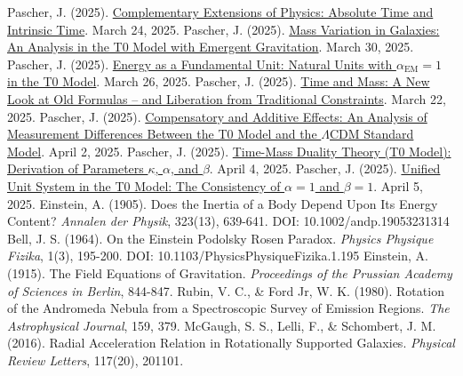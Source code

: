 \documentclass[12pt,a4paper]{article}
\newcommand{\alphaEM}{\alpha_{\text{EM}}}
\begin{document}
	\begin{thebibliography}{99}
		 Pascher, J. (2025). \href{https://github.com/jpascher/T0-Time-Mass-Duality/tree/main/2/pdf/English/KomplementPhysikZeitEn.pdf}{Complementary Extensions of Physics: Absolute Time and Intrinsic Time}. March 24, 2025.
		 Pascher, J. (2025). \href{https://github.com/jpascher/T0-Time-Mass-Duality/tree/main/2/pdf/English/MassVarGalaxienEn.pdf}{Mass Variation in Galaxies: An Analysis in the T0 Model with Emergent Gravitation}. March 30, 2025.
		 Pascher, J. (2025). \href{https://github.com/jpascher/T0-Time-Mass-Duality/tree/main/2/pdf/English/NatEinheitenAlpha1En.pdf}{Energy as a Fundamental Unit: Natural Units with \(\alphaEM = 1\) in the T0 Model}. March 26, 2025.
		 Pascher, J. (2025). \href{https://github.com/jpascher/T0-Time-Mass-Duality/tree/main/2/pdf/English/ZeitMasseNeuerBlickEn.pdf}{Time and Mass: A New Look at Old Formulas – and Liberation from Traditional Constraints}. March 22, 2025.
		 Pascher, J. (2025). \href{https://github.com/jpascher/T0-Time-Mass-Duality/tree/main/2/pdf/English/MessdifferenzenT0StandardEn.pdf}{Compensatory and Additive Effects: An Analysis of Measurement Differences Between the T0 Model and the \(\Lambda\)CDM Standard Model}. April 2, 2025.
		 Pascher, J. (2025). \href{https://github.com/jpascher/T0-Time-Mass-Duality/tree/main/2/pdf/English/ZeitMasseT0ParamsEn.pdf}{Time-Mass Duality Theory (T0 Model): Derivation of Parameters \(\kappa\), \(\alpha\), and \(\beta\)}. April 4, 2025.
		 Pascher, J. (2025). \href{https://github.com/jpascher/T0-Time-Mass-Duality/tree/main/2/pdf/English/Alpha1Beta1KonsistenzEn.pdf}{Unified Unit System in the T0 Model: The Consistency of \(\alpha = 1\) and \(\beta = 1\)}. April 5, 2025.
		 Einstein, A. (1905). Does the Inertia of a Body Depend Upon Its Energy Content? \textit{Annalen der Physik}, 323(13), 639-641. DOI: 10.1002/andp.19053231314
		 Bell, J. S. (1964). On the Einstein Podolsky Rosen Paradox. \textit{Physics Physique Fizika}, 1(3), 195-200. DOI: 10.1103/PhysicsPhysiqueFizika.1.195
		 Einstein, A. (1915). The Field Equations of Gravitation. \textit{Proceedings of the Prussian Academy of Sciences in Berlin}, 844-847.
		 Rubin, V. C., \& Ford Jr, W. K. (1980). Rotation of the Andromeda Nebula from a Spectroscopic Survey of Emission Regions. \textit{The Astrophysical Journal}, 159, 379.
		 McGaugh, S. S., Lelli, F., \& Schombert, J. M. (2016). Radial Acceleration Relation in Rotationally Supported Galaxies. \textit{Physical Review Letters}, 117(20), 201101.
	\end{thebibliography}
	
\end{document}

